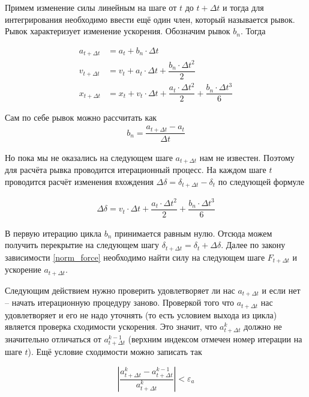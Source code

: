 \documentclass[a4paper]{article}
\begin{document}
Примем изменение силы линейным на шаге от $t$ до $t + \Delta t$  и тогда для интегрирования необходимо ввести ещё один член, который называется рывок. 
Рывок характеризует изменение ускорения.
Обозначим рывок $b_n$.
Тогда

\begin{align*}
a_{t + \Delta t} &= a_t + b_n \cdot \Delta t \\
v_{t + \Delta t} &= v_t + a_t \cdot \Delta t + \dfrac{b_n \cdot \Delta t^2}{2} \\
x_{t + \Delta t} &= x_t + v_t \cdot \Delta t + \dfrac{a_t \cdot \Delta t^2}{2} +  \dfrac{b_n \cdot \Delta t^3}{6}
\end{align*}

Сам по себе рывок можно рассчитать как
\begin{align}
\label{jerk_normal}
b_n = \dfrac{a_{t + \Delta t} - a_{t}}{\Delta t}
\end{align}

Но пока мы не оказались на следующем шаге $a_{t + \Delta t}$ нам не известен.
Поэтому для расчёта рывка проводится итерационный процесс. 
На каждом шаге $t$ проводится расчёт изменения вхождения $\Delta \delta = \delta_{t + \Delta t} - \delta_t$ по следующей формуле

\begin{align*}
\Delta \delta = v_t \cdot \Delta t + \dfrac{a_t \cdot \Delta t^2}{2} +  \dfrac{b_n \cdot \Delta t^3}{6}
\end{align*}

В первую итерацию цикла $b_n$ принимается равным нулю.
Отсюда можем получить перекрытие на следующем шагу $\delta_{t + \Delta t} = \delta_t + \Delta \delta$.
Далее по закону зависимости \ref{norm_force} необходимо найти силу на следующем шаге $F_{t + \Delta t}$ и ускорение $a_{t + \Delta t}$.

Следующим действием нужно проверить удовлетворяет ли нас $a_{t + \Delta t}$ и если нет -- начать итерационную процедуру заново.
Проверкой того что $a_{t + \Delta t}$ нас удовлетворяет и его не надо уточнять (то есть условием выхода из цикла) является проверка сходимости ускорения.
Это значит, что $a_{t + \Delta t}^k$ должно не значительно отличаться от  $a_{t + \Delta t}^{k-1}$ (верхним индексом отмечен номер итерации на шаге $t$). 
Ещё условие сходимости можно записать так

\begin{equation}
\label{jerk_condition}
\left| \dfrac{a_{t + \Delta t}^k - a_{t + \Delta t}^{k-1}}{a_{t + \Delta t}^k} \right| < \varepsilon_a
\end{equation}
\end{document}
